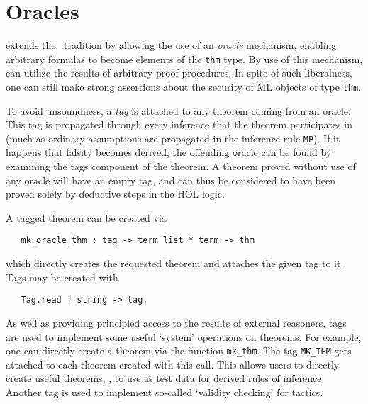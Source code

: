 \section{Oracles}

\HOL{} extends the \LCF\ tradition by allowing the use of an \emph
{oracle} mechanism, enabling arbitrary formulas to become elements of
the \verb+thm+ type. By use of this mechanism, \HOL{} can utilize the
results of arbitrary proof procedures. In spite of such liberalness, one
can still make strong assertions about the security of ML objects of
type \verb+thm+.

To avoid unsoundness, a \emph{tag} is attached to any theorem
coming from an oracle. This tag is propagated through every
inference that the theorem participates in (much as ordinary assumptions
are propagated in the inference rule {\small\verb+MP+}). If it happens
that falsity becomes derived, the offending oracle can be found by
examining the tags component of the theorem. A theorem proved without
use of any oracle will have an empty tag, and can thus be considered to
have been proved solely by deductive steps in the HOL logic.

A tagged theorem can be created via

\begin{boxed}
\begin{verbatim}
   mk_oracle_thm : tag -> term list * term -> thm
\end{verbatim}\end{boxed}

which directly creates the requested theorem and attaches the given tag to
it. Tags may be created with

\begin{boxed}
\begin{verbatim}
   Tag.read : string -> tag.
\end{verbatim}\end{boxed}

As well as providing principled access to the results of external
reasoners, tags are used to implement some useful `system' operations on
theorems. For example, one can directly create a theorem via the function
\verb+mk_thm+. The tag \verb+MK_THM+ gets attached to each theorem
created with this call. This allows users to directly create useful
theorems, \eg, to use as test data for derived rules of inference.
Another tag is used to implement so-called `validity checking' for tactics.

